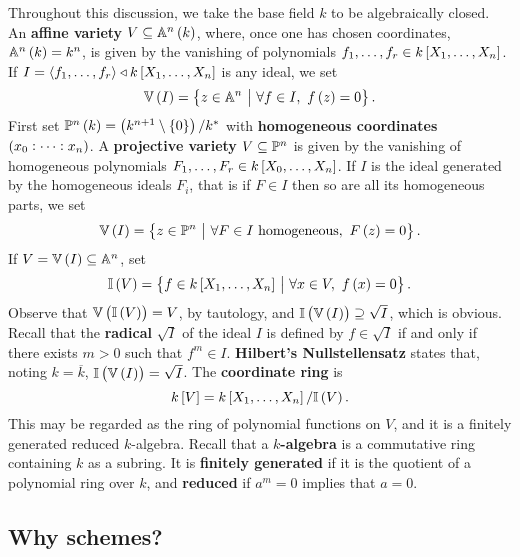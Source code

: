 Throughout this discussion, we take the base field $ k $ to be algebraically closed. An \textbf{affine variety} $ V \subseteq \AA^n\br{k} $, where, once one has chosen coordinates, $ \AA^n\br{k} = k^n $, is given by the vanishing of polynomials $ f_1, \dots, f_r \in k\sbr{X_1, \dots, X_n} $. If $ I = \abr{f_1, \dots, f_r} \triangleleft k\sbr{X_1, \dots, X_n} $ is any ideal, we set
$$ \VV\br{I} = \cbr{z \in \AA^n \st \forall f \in I, \ f\br{z} = 0}. $$
First set $ \PP^n\br{k} = \br{k^{n + 1} \setminus \cbr{0}} / k^* $ with \textbf{homogeneous coordinates} $ \br{x_0 : \dots : x_n} $. A \textbf{projective variety} $ V \subseteq \mathbb{P}^n $ is given by the vanishing of homogeneous polynomials $ F_1, \dots, F_r \in k\sbr{X_0, \dots, X_n} $. If $ I $ is the ideal generated by the homogeneous ideals $ F_i $, that is if $ F \in I $ then so are all its homogeneous parts, we set
$$ \VV\br{I} = \cbr{z \in \PP^n \st \forall F \in I \ \text{homogeneous}, \ F\br{z} = 0}. $$
If $ V = \VV\br{I} \subseteq \AA^n $, set
$$ \II\br{V} = \cbr{f \in k\sbr{X_1, \dots, X_n} \st \forall x \in V, \ f\br{x} = 0}. $$
Observe that $ \VV\br{\II\br{V}} = V $, by tautology, and $ \II\br{\VV\br{I}} \supseteq \sqrt{I} $, which is obvious. Recall that the \textbf{radical} $ \sqrt{I} $ of the ideal $ I $ is defined by $ f \in \sqrt{I} $ if and only if there exists $ m > 0 $ such that $ f^m \in I $. \textbf{Hilbert's Nullstellensatz} states that, noting $ k = \overline{k} $, $ \II\br{\VV\br{I}} = \sqrt{I} $. The \textbf{coordinate ring} is
$$ k\sbr{V} = k\sbr{X_1, \dots, X_n} / \II\br{V}. $$
This may be regarded as the ring of polynomial functions on $ V $, and it is a finitely generated reduced $ k $-algebra. Recall that a \textbf{$ k $-algebra} is a commutative ring containing $ k $ as a subring. It is \textbf{finitely generated} if it is the quotient of a polynomial ring over $ k $, and \textbf{reduced} if $ a^m = 0 $ implies that $ a = 0 $.

\subsection{Why schemes?}

